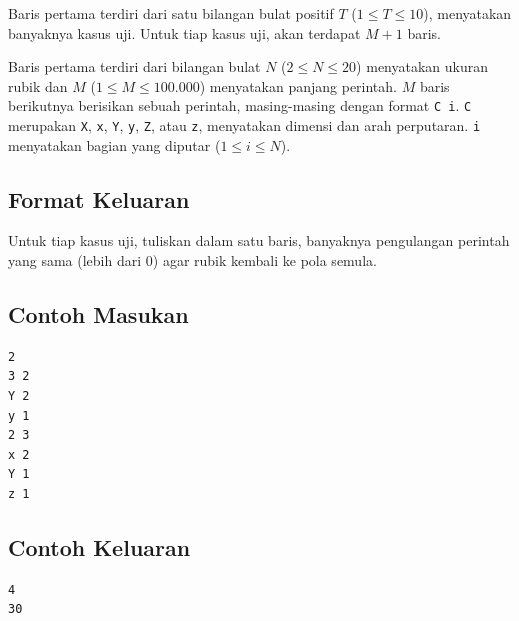 \documentclass{article}
\begin{document}
Baris pertama terdiri dari satu bilangan bulat positif $T$ ($1 \leq T \leq 10$), menyatakan banyaknya kasus uji.
Untuk tiap kasus uji, akan terdapat $M + 1$ baris.

Baris pertama terdiri dari bilangan bulat $N$ ($2 \leq N \leq 20$) menyatakan ukuran rubik dan $M$ ($1 \leq M \leq 100.000$) menyatakan panjang perintah.
$M$ baris berikutnya berisikan sebuah perintah, masing-masing dengan format \lstinline{C i}.
\lstinline{C} merupakan \lstinline{X}, \lstinline{x}, \lstinline{Y}, \lstinline{y}, \lstinline{Z}, atau \lstinline{z}, menyatakan dimensi dan arah perputaran.
\lstinline{i} menyatakan bagian yang diputar ($1 \leq i \leq N$).

\subsection*{Format Keluaran}

Untuk tiap kasus uji, tuliskan dalam satu baris, banyaknya pengulangan perintah yang sama (lebih dari 0) agar rubik kembali ke pola semula.
\\

\begin{multicols}{2}
\subsection*{Contoh Masukan}
\begin{lstlisting}
2
3 2
Y 2
y 1
2 3
x 2
Y 1
z 1
\end{lstlisting}
\columnbreak
\subsection*{Contoh Keluaran}
\begin{lstlisting}
4
30
\end{lstlisting}
\vfill
\null
\end{multicols}
\end{document}
